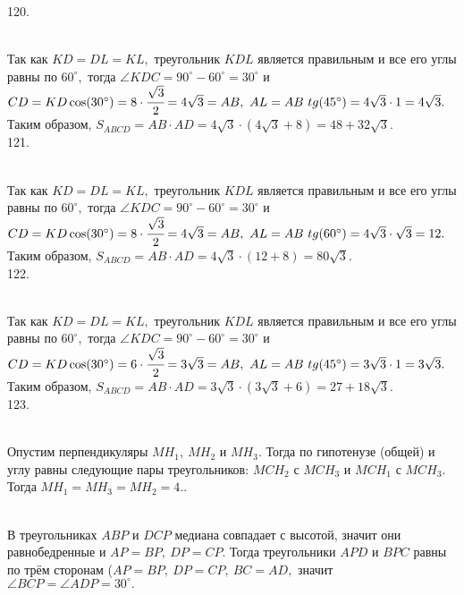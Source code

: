 120. \begin{figure}[ht!]
\end{figure}\\
Так как $KD=DL=KL,$ треугольник $KDL$ является правильным и все его углы равны по $60^\circ,$ тогда $\angle KDC=90^\circ-60^\circ=30^\circ$ и $CD=KD\cos(30^\circ)=8\cdot\cfrac{\sqrt{3}}{2}=4\sqrt{3}=AB,\ AL=AB\ tg(45^\circ)=4\sqrt{3}\cdot1=4\sqrt{3}.$ Таким образом, $S_{ABCD}=AB\cdot AD=4\sqrt{3}\cdot(4\sqrt{3}+8)=48+32\sqrt{3}.$\\
121.\begin{figure}[ht!]
\end{figure}\\
Так как $KD=DL=KL,$ треугольник $KDL$ является правильным и все его углы равны по $60^\circ,$ тогда $\angle KDC=90^\circ-60^\circ=30^\circ$ и $CD=KD\cos(30^\circ)=8\cdot\cfrac{\sqrt{3}}{2}=4\sqrt{3}=AB,\ AL=AB\ tg(60^\circ)=4\sqrt{3}\cdot\sqrt{3}=12.$ Таким образом, $S_{ABCD}=AB\cdot AD=4\sqrt{3}\cdot(12+8)=80\sqrt{3}.$\\
122. \begin{figure}[ht!]
\end{figure}\\
Так как $KD=DL=KL,$ треугольник $KDL$ является правильным и все его углы равны по $60^\circ,$ тогда $\angle KDC=90^\circ-60^\circ=30^\circ$ и $CD=KD\cos(30^\circ)=6\cdot\cfrac{\sqrt{3}}{2}=3\sqrt{3}=AB,\ AL=AB\ tg(45^\circ)=3\sqrt{3}\cdot1=3\sqrt{3}.$ Таким образом, $S_{ABCD}=AB\cdot AD=3\sqrt{3}\cdot(3\sqrt{3}+6)=27+18\sqrt{3}.$\\
123. \begin{figure}[ht!]
\end{figure}\\
Опустим перпендикуляры $MH_1,\ MH_2$ и $MH_3.$ Тогда по гипотенузе (общей) и углу равны следующие пары треугольников: $MCH_2$ с $MCH_3$ и $MCH_1$ с $MCH_3.$ Тогда $MH_1=MH_3=MH_2=4.$\newpage{}. \begin{figure}[ht!]
\end{figure}\\
В треугольниках $ABP$ и $DCP$ медиана совпадает с высотой, значит они равнобедренные и $AP=BP,\ DP=CP.$ Тогда треугольники $APD$ и $BPC$ равны по трём сторонам ($AP=BP,\ DP=CP,\ BC=AD,$ значит $\angle BCP=\angle ADP=30^\circ.$\\
